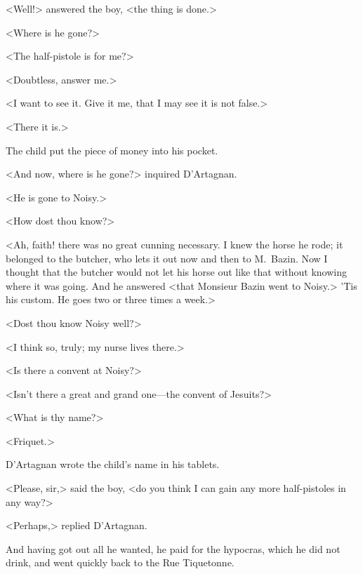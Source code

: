 <Well!> answered the boy, <the thing is done.>

<Where is he gone?>

<The half-pistole is for me?>

<Doubtless, answer me.>

<I want to see it. Give it me, that I may see it is not false.>

<There it is.>

The child put the piece of money into his pocket.

<And now, where is he gone?> inquired D'Artagnan.

<He is gone to Noisy.>

<How dost thou know?>

<Ah, faith! there was no great cunning necessary. I knew the horse he rode; it belonged to the butcher, who lets it out now and then to M.~Bazin. Now I thought that the butcher would not let his horse out like that without knowing where it was going. And he answered <that Monsieur Bazin went to Noisy.> 'Tis his custom. He goes two or three times a week.>

<Dost thou know Noisy well?>

<I think so, truly; my nurse lives there.>

<Is there a convent at Noisy?>

<Isn't there a great and grand one—the convent of Jesuits?>

<What is thy name?>

<Friquet.>

D'Artagnan wrote the child's name in his tablets.

<Please, sir,> said the boy, <do you think I can gain any more half-pistoles in any way?>

<Perhaps,> replied D'Artagnan.

And having got out all he wanted, he paid for the hypocras, which he did not drink, and went quickly back to the Rue Tiquetonne. 